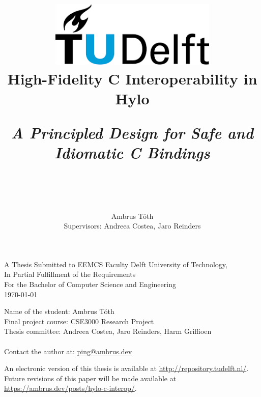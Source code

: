 \title{
    \includegraphics[width=8cm, keepaspectratio]{tudelftlogo.png}\\
    \vspace*{2cm}
    \textbf{
        {High-Fidelity C Interoperability in Hylo}
    }\\
    \vspace*{0.5cm}
    
    \parbox{0.9\linewidth}{
        \centering
        \textit{A Principled Design for Safe and Idiomatic C Bindings}
    }\\

    \vspace*{.3cm}


    \author{
        Ambrus Tóth\\
        Supervisors: Andreea Costea, Jaro Reinders\\
    }
}


\date{}

\maketitle
\thispagestyle{empty}

\let\clearpagebackup\clearpage
\renewcommand{\clearpage}{ }

\onecolumn

\begin{center}
    A Thesis Submitted to EEMCS Faculty Delft University of Technology,\\
    In Partial Fulfillment of the Requirements\\
    For the Bachelor of Computer Science and Engineering\\
    \today
\end{center}

\vspace*{2cm}

\noindent
{\small
Name of the student: Ambrus Tóth\\
Final project course: CSE3000 Research Project\\
Thesis committee: Andreea Costea, Jaro Reinders, Harm Griffioen\\ \\
Contact the author at: \href{mailto:ping@ambrus.dev}{ping@ambrus.dev}
}
\vfill

\begin{center}
    An electronic version of this thesis is available at \url{http://repository.tudelft.nl/}.\\
    Future revisions of this paper will be made available at \url{https://ambrus.dev/posts/hylo-c-interop/}.
\end{center}

\twocolumn
\let\clearpage\clearpagebackup  
\clearpage
